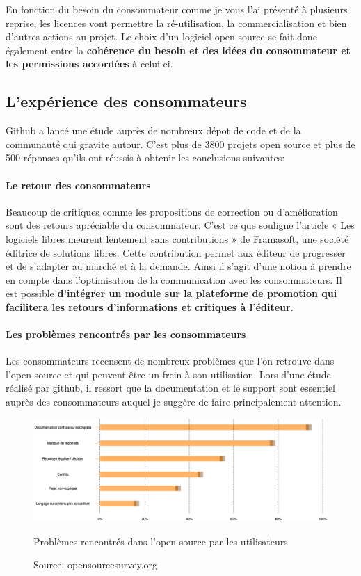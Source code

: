			En fonction du besoin du consommateur comme je vous l'ai présenté à plusieurs reprise, les licences vont permettre la ré-utilisation, la commercialisation et bien d'autres actions au projet. Le choix d'un logiciel open source se fait donc également entre la \textbf{cohérence du besoin et des idées du consommateur et les permissions accordées} à celui-ci.

		\subsection{L'expérience des consommateurs}

			Github a lancé une étude auprès de nombreux dépot de code et de la communauté qui gravite autour. C'est plus de 3800 projets open source et plus de 500 réponses qu'ils ont réussis à obtenir les conclusions suivantes:

			\paragraph{Le retour des consommateurs \\}

				Beaucoup de critiques comme les propositions de correction ou d'amélioration sont des retours apréciable du consommateur. C'est ce que souligne l'article « Les logiciels libres meurent lentement sans contributions » de Framasoft, une société éditrice de solutions libres. 
				Cette contribution permet aux éditeur de progresser et de s'adapter au marché et à la demande.
				Ainsi il s'agit d'une notion à prendre en compte dans l'optimisation de la communication avec les consommateurs. Il est possible \textbf{d'intégrer un module sur la plateforme de promotion qui facilitera les retours d'informations et critiques à l'éditeur}. 

			\paragraph{Les problèmes rencontrés par les consommateurs\\}

				Les consommateurs recensent de nombreux problèmes que l'on retrouve dans l'open source et qui peuvent être un frein à son utilisation. Lors d'une étude réalisé par github, il ressort que la documentation et le support sont essentiel auprès des consommateurs auquel je suggère de faire principalement attention. 

				\begin{figure}[!htb]
					\center
					\includegraphics[scale=0.50]{./img/pb_os.png}
					\caption{Problèmes rencontrés dans l'open source par les utilisateurs}
   					\caption*{\color{silver}Source: opensourcesurvey.org}
				\end{figure}
				\clearpage

